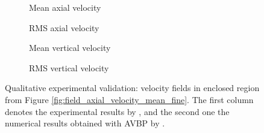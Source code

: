 \clearpage

\begin{figure}[h!]
\centering
\begin{subfigure}[b]{1.0\textwidth}
	\centering
   \caption{Mean axial velocity}
   \label{fig:validation_qualitative_u_mean} 
\end{subfigure}
\begin{subfigure}[b]{1.0\textwidth}
	\centering
   \caption{RMS axial velocity}
   \label{fig:validation_qualitative_u_rms}
\end{subfigure}
\begin{subfigure}[b]{1.0\textwidth}
	\centering
   \caption{Mean vertical velocity}
   \label{fig:validation_qualitative_v_mean} 
\end{subfigure}
\begin{subfigure}[b]{1.0\textwidth}
	\centering
   \caption{RMS vertical velocity}
   \label{fig:validation_qualitative_v_rms}
\end{subfigure}
\caption[Qualitative experimental validation]{Qualitative experimental validation: velocity fields in enclosed region from Figure \ref{fig:field_axial_velocity_mean_fine}. The first column denotes the experimental results by , and the second one the numerical results obtained with AVBP by .}
\label{fig:validation_qualitative_velocity_fields}
\end{figure}


\clearpage

